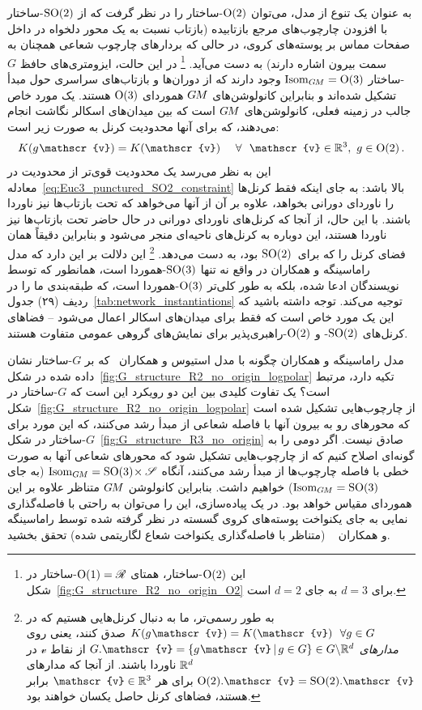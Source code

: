 به عنوان یک تنوع از مدل، می‌توان $\operatorname{O}(2)$-ساختار را در نظر گرفت که از $\operatorname{SO}(2)$-ساختار با افزودن چارچوب‌های مرجع بازتابیده (بازتاب نسبت به یک محور دلخواه در داخل صفحات مماس بر پوسته‌های کروی، در حالی که بردارهای چارچوب شعاعی همچنان به سمت بیرون اشاره دارند) به دست می‌آید.%
\footnote{
	این $\operatorname{O}(2)$-ساختار، همتای $\operatorname{O}(1) = \mathscr{R}$-ساختار در شکل~\ref{fig:G_structure_R2_no_origin_O2} برای $d=3$ به جای $d=2$ است.
}
در این حالت، ایزومتری‌های حافظ $G$-ساختار $\operatorname{Isom}_{G\mkern-1.4muM} = \operatorname{O}(3)$ وجود دارند که از دوران‌ها و بازتاب‌های سراسری حول مبدأ تشکیل شده‌اند و بنابراین کانولوشن‌های $G\mkern-1.4muM$ هموردای $\operatorname{O}(3)$ هستند.
یک مورد خاص جالب در زمینه فعلی، کانولوشن‌های $G\mkern-1.4muM$ است که بین میدان‌های اسکالر نگاشت انجام می‌دهند، که برای آنها محدودیت کرنل به صورت زیر است:
\begin{align}\label{eq:Euc3_punctured_O2_constraint}
	K(g\mkern1mu \mathscr{v}) = K(\mathscr{v}) \quad\ \forall\ \ \mathscr{v}\in\R^3,\ g\in\OO2 \,.
\end{align}
این به نظر می‌رسد یک محدودیت قوی‌تر از محدودیت در معادله~\eqref{eq:Euc3_punctured_SO2_constraint} بالا باشد:
به جای اینکه فقط کرنل‌ها را ناوردای دورانی بخواهد، علاوه بر آن از آنها می‌خواهد که تحت بازتاب‌ها نیز ناوردا باشند.
با این حال، از آنجا که کرنل‌های ناوردای دورانی در حال حاضر تحت بازتاب‌ها نیز ناوردا هستند، این دوباره به کرنل‌های ناحیه‌ای منجر می‌شود و بنابراین دقیقاً همان فضای کرنل را که برای~$\operatorname{SO}(2)$ بود، به دست می‌دهد.%
\footnote{
	به طور رسمی‌تر، ما به دنبال کرنل‌هایی هستیم که در $K(g\mkern1mu \mathscr{v}) = K(\mathscr{v})\ \ \forall g\in G$ صدق کنند، یعنی روی \emph{مدارهای} $G.\mathscr{v} = \{g\mkern1mu \mathscr{v} \,|\, g\in G\} \in G \backslash \R^d$ از نقاط $\mathscr{v}$ در $\mathbb{R}^d$ ناوردا باشند.
	از آنجا که مدارهای $\OO2.\mathscr{v} = \SO2.\mathscr{v}$ برای هر $\mathscr{v}\in\R^3$ برابر هستند، فضاهای کرنل حاصل یکسان خواهند بود.
}
این دلالت بر این دارد که مدل راماسینگه و همکاران \cite{ramasinghe2019representation} در واقع نه تنها $\operatorname{SO}(3)$-هموردا است، همانطور که توسط نویسندگان ادعا شده، بلکه به طور کلی‌تر $\operatorname{O}(3)$-هموردا است، که طبقه‌بندی ما را در ردیف (۲۹) جدول~\ref{tab:network_instantiations} توجیه می‌کند.
توجه داشته باشید که این یک مورد خاص است که فقط برای میدان‌های اسکالر اعمال می‌شود -- فضاهای کرنل‌های $\operatorname{SO}(2)$- و $\operatorname{O}(2)$-راهبری‌پذیر برای نمایش‌های گروهی عمومی متفاوت هستند.


مدل راماسینگه و همکاران  \cite{ramasinghe2019representation} چگونه با مدل استیوس و همکاران~\cite{esteves2017polar} که بر $G$-ساختار نشان داده شده در شکل~\ref{fig:G_structure_R2_no_origin_logpolar} تکیه دارد، مرتبط است؟
یک تفاوت کلیدی بین این دو رویکرد این است که $G$-ساختار در شکل~\ref{fig:G_structure_R2_no_origin_logpolar} از چارچوب‌هایی تشکیل شده است که محورهای رو به بیرون آنها با فاصله شعاعی از مبدأ رشد می‌کنند، که این مورد برای $G$-ساختار در شکل~\ref{fig:G_structure_R3_no_origin} صادق نیست.
اگر دومی را به گونه‌ای اصلاح کنیم که از چارچوب‌هایی تشکیل شود که محورهای شعاعی آنها به صورت خطی با فاصله چارچوب‌ها از مبدأ رشد می‌کنند، آنگاه $\operatorname{Isom}_{G\mkern-1.4muM} = \operatorname{SO}(3) \!\times \mathscr{S}$ (به جای $\operatorname{Isom}_{G\mkern-1.4muM} = \operatorname{SO}(3)$) خواهیم داشت.
بنابراین کانولوشن $G\mkern-1.4muM$ متناظر علاوه بر این هموردای مقیاس خواهد بود.
در یک پیاده‌سازی، این را می‌توان به راحتی با فاصله‌گذاری نمایی به جای یکنواخت پوسته‌های کروی گسسته در نظر گرفته شده توسط راماسینگه و همکاران ~\cite{ramasinghe2019representation} (متناظر با فاصله‌گذاری یکنواخت شعاع لگاریتمی شده) تحقق بخشید.


